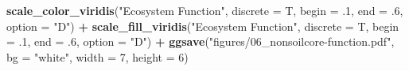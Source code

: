 \documentclass[]{article}
\newenvironment{Shaded}{\begin{snugshade}}{\end{snugshade}}
\newcommand{\KeywordTok}[1]{\textcolor[rgb]{0.13,0.29,0.53}{\textbf{#1}}}
\newcommand{\DataTypeTok}[1]{\textcolor[rgb]{0.13,0.29,0.53}{#1}}
\newcommand{\DecValTok}[1]{\textcolor[rgb]{0.00,0.00,0.81}{#1}}
\newcommand{\StringTok}[1]{\textcolor[rgb]{0.31,0.60,0.02}{#1}}
\newcommand{\OperatorTok}[1]{\textcolor[rgb]{0.81,0.36,0.00}{\textbf{#1}}}
\newcommand{\NormalTok}[1]{#1}
\begin{document}
\begin{Shaded}
\begin{Highlighting}[]
{{{{{\StringTok{  }\KeywordTok{scale_color_viridis}\NormalTok{(}\StringTok{"Ecosystem Function"}\NormalTok{, }\DataTypeTok{discrete =}\NormalTok{ T, }\DataTypeTok{begin =}\NormalTok{ .}\DecValTok{1}\NormalTok{, }\DataTypeTok{end =}\NormalTok{ .}\DecValTok{6}\NormalTok{, }\DataTypeTok{option =} \StringTok{"D"}\NormalTok{) }\OperatorTok{+}
\StringTok{  }\KeywordTok{scale_fill_viridis}\NormalTok{(}\StringTok{"Ecosystem Function"}\NormalTok{, }\DataTypeTok{discrete =}\NormalTok{ T, }\DataTypeTok{begin =}\NormalTok{ .}\DecValTok{1}\NormalTok{, }\DataTypeTok{end =}\NormalTok{ .}\DecValTok{6}\NormalTok{, }\DataTypeTok{option =} \StringTok{"D"}\NormalTok{) }\OperatorTok{+}
\StringTok{  }\KeywordTok{ggsave}\NormalTok{(}\StringTok{"figures/06_nonsoilcore-function.pdf"}\NormalTok{, }\DataTypeTok{bg =} \StringTok{"white"}\NormalTok{, }\DataTypeTok{width =} \DecValTok{7}\NormalTok{, }\DataTypeTok{height =} \DecValTok{6}\NormalTok{)}



}}}}}
\end{Highlighting}
\end{Shaded}
\end{document}
